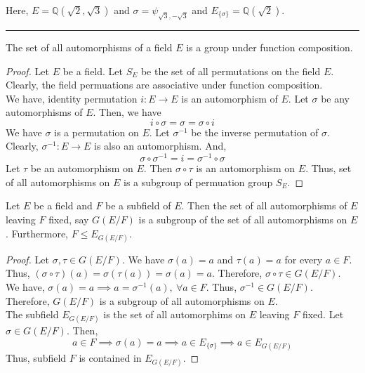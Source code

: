 \begin{commentary}
	Here, $E = \mathbb{Q}\left(\sqrt{2},\sqrt{3}\right)$ and $\sigma = \psi_{\sqrt{3},-\sqrt{3}}$ and $E_{\{\sigma\}} = \mathbb{Q}\left( \sqrt{2} \right)$.
\end{commentary}
\hrule \vspace{1em}
\begin{theorem}
	The set of all automorphisms of a field $E$ is a group under function composition.
\end{theorem}
\begin{proof} 
	Let $E$ be a field.
	Let $S_E$ be the set of all permutations on the field $E$.
	Clearly, the field permuations are associative under function composition.\\

	We have, identity permutation $i : E \to E$ is an automorphism of $E$.
	Let $\sigma$ be any automorphisms of $E$.
	Then, we have 
	\[ i \circ \sigma = \sigma = \sigma \circ i \]
	We have $\sigma$ is a permutation on $E$.
	Let $\sigma^{-1}$ be the inverse permutation of $\sigma$.
	Clearly, $\sigma^{-1} : E \to E$ is also an automorphism.
	And,
	\[ \sigma \circ \sigma^{-1} = i = \sigma^{-1} \circ \sigma \]
	Let $\tau$ be an automorphism on $E$.
	Then $\sigma \circ \tau$ is an automorphism on $E$.
	Thus, set of all automorphisms on $E$ is a subgroup of permuation group $S_E$.
\end{proof} 

\begin{theorem}
	Let $E$ be a field and $F$ be a subfield of $E$.
	Then the set of all automorphisms of $E$ leaving $F$ fixed, say $G(E/F)$ is a subgroup of the set of all automorphisms on $E$.
	Furthermore, $F \le E_{G(E/F)}$.
\end{theorem}
\begin{proof} 
	Let $\sigma,\tau \in G(E/F)$.
	We have $\sigma(a) = a$ and $\tau(a) = a$ for every $a \in F$.
	Thus, $(\sigma \circ \tau)(a) = \sigma(\tau(a)) = \sigma(a) = a$.
	Therefore, $\sigma \circ \tau \in G(E/F)$.\\

	We have, $\sigma(a) = a \implies a = \sigma^{-1}(a),\ \forall a \in F$.
	Thus, $\sigma^{-1} \in G(E/F)$.	
	Therefore, $G(E/F)$ is a subgroup of all automorphisms on $E$.\\

	The subfield $E_{G(E/F)}$ is the set of all automorphims on $E$ leaving $F$ fixed.
	Let $\sigma \in G(E/F)$.
	Then, 
	\[ a \in F \implies \sigma(a) = a \implies a \in E_{\{\sigma\}} \implies a \in E_{G(E/F)} \]
	Thus, subfield $F$ is contained in $E_{G(E/F)}$.
\end{proof} 

